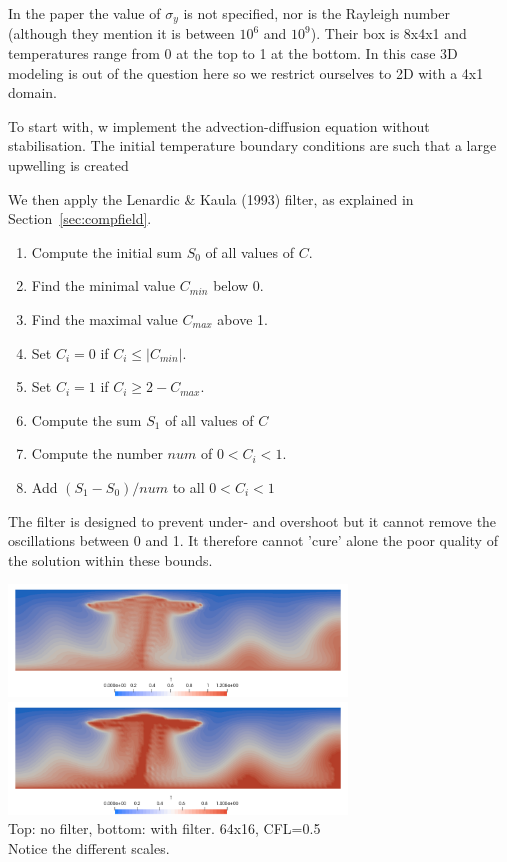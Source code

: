 In the paper the value of $\sigma_y$ is not specified, nor is the Rayleigh number (although 
they mention it is between $10^6$ and $10^9$).
Their box is 8x4x1 and temperatures range from 0 at the top to 1 at the bottom.
In this case 3D modeling is out of the question here so we restrict ourselves to 2D with a 4x1 domain. 




To start with, w implement the advection-diffusion equation without stabilisation. The initial temperature
boundary conditions are such that a large upwelling is created


We then apply the Lenardic \& Kaula (1993) \cite{leka93} filter, as explained in Section~\ref{sec:compfield}.
\begin{enumerate}
\item Compute the initial sum $S_0$ of all values of $C$.
\item Find the minimal value $C_{min}$ below 0.
\item Find the maximal value $C_{max}$ above 1.
\item Set $C_i=0$ if $C_i \leq |C_{min}|$.
\item Set $C_i=1$ if $C_i \geq 2-C_{max}$. 
\item Compute the sum $S_1$ of all values of $C$
\item Compute the number $num$ of $0 < C_i < 1$.
\item Add $(S_1-S_0)/num$ to all $0<C_i<1$
\end{enumerate}


The filter is designed to prevent under- and overshoot but it cannot remove the oscillations between 0 and 1.
It therefore cannot 'cure' alone the poor quality of the solution within these bounds.
\begin{center}
\includegraphics[width=9cm]{python_codes/fieldstone_88/results/without}\\
\includegraphics[width=9cm]{python_codes/fieldstone_88/results/with}\\
{\captionfont Top: no filter, bottom: with filter. 64x16, CFL=0.5\\ Notice the different scales.}
\end{center}


